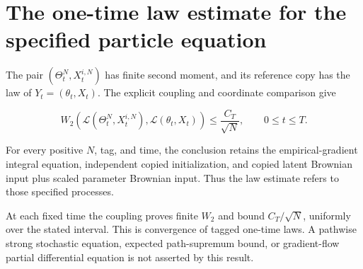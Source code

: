 \documentclass[11pt,a4paper]{article}
\begin{document}
\section{\texorpdfstring{The one-time law estimate for the specified particle equation}{The one-time law estimate for the specified particle equation}}


The pair \((\Theta_t^N,X_t^{i,N})\) has finite second moment, and its reference copy has the law of \(Y_t=(\theta_t,X_t)\). The explicit coupling and coordinate comparison give

\[
W_2\!\left(\mathcal L(\Theta_t^N,X_t^{i,N}),\mathcal L(\theta_t,X_t)\right)
 \le\frac{C_T}{\sqrt N},\qquad 0\le t\le T.
\]

For every positive \(N\), tag, and time, the conclusion retains the empirical-gradient integral equation, independent copied initialization, and copied latent Brownian input plus scaled parameter Brownian input. Thus the law estimate refers to those specified processes.



At each fixed time the coupling proves finite \(W_2\) and bound \(C_T/\sqrt N\), uniformly over the stated interval. This is convergence of tagged one-time laws. A pathwise strong stochastic equation, expected path-supremum bound, or gradient-flow partial differential equation is not asserted by this result.
\end{document}
